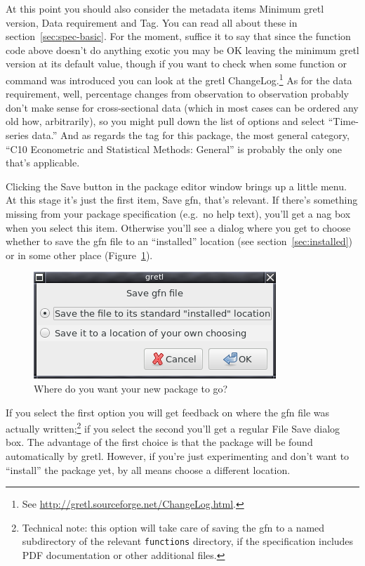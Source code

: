 \documentclass[oneside]{book}
\begin{document}
At this point you should also consider the metadata items
\textsf{Minimum gretl version}, \textsf{Data requirement} and
\textsf{Tag}.  You can read all about these in
section~\ref{sec:spec-basic}. For the moment, suffice it to say that
since the function code above doesn't do anything exotic you may be OK
leaving the minimum gretl version at its default value, though if you
want to check when some function or command was introduced you can
look at the gretl ChangeLog.\footnote{See
  \url{http://gretl.sourceforge.net/ChangeLog.html}.} As for the data
requirement, well, percentage changes from observation to observation
probably don't make sense for cross-sectional data (which in most
cases can be ordered any old how, arbitrarily), so you might pull down
the list of options and select ``Time-series data.'' And as regards
the tag for this package, the most general category, ``C10 Econometric
and Statistical Methods: General'' is probably the only one that's
applicable.

Clicking the \textsf{Save} button in the package editor window brings
up a little menu. At this stage it's just the first item, \textsf{Save
  gfn}, that's relevant. If there's something missing from your
package specification (e.g.\ no help text), you'll get a nag box when
you select this item. Otherwise you'll see a dialog where you get to
choose whether to save the \textsf{gfn} file to an ``installed''
location (see section~\ref{sec:installed}) or in some other place
(Figure~\ref{fig:gfnsave}).

\begin{figure}[htbp]
  \centering
  \includegraphics[scale=0.45]{figures/gfnsave}
  \caption{Where do you want your new package to go?}
  \label{fig:gfnsave}
\end{figure}

If you select the first option you will get feedback on where the gfn
file was actually written;\footnote{Technical note: this option will
  take care of saving the \textsf{gfn} to a named subdirectory of the
  relevant \texttt{functions} directory, if the specification includes
  PDF documentation or other additional files.} if you select the
second you'll get a regular File Save dialog box. The advantage of the
first choice is that the package will be found automatically by gretl.
However, if you're just experimenting and don't want to ``install''
the package yet, by all means choose a different location.
\end{document}
